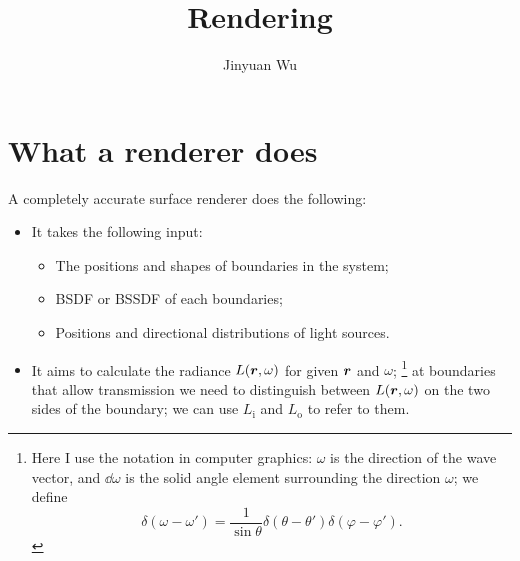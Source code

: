 \documentclass[hyperref, a4paper]{article}
\title{Rendering}
\author{Jinyuan Wu}
\begin{document}
\maketitle

\section{What a renderer does}

A completely accurate surface renderer does the following:
\begin{itemize}
    \item It takes the following input: 
        \begin{itemize}
            \item The positions and shapes of boundaries in the system;
            \item BSDF or BSSDF of each boundaries;
            \item Positions and directional distributions of light sources.
        \end{itemize}
    \item It aims to calculate the radiance $L(\vb*{r}, \omega)$
        for given $\vb*{r}$ and $\omega$;%
        \footnote{
            Here I use the notation in computer graphics: 
            $\omega$ is the direction of the wave vector, 
            and $\dd{\omega}$ is the solid angle element 
            surrounding the direction $\omega$;
            we define 
            \begin{equation}
                \delta(\omega - \omega') = \frac{1}{\sin \theta} \delta(\theta - \theta') \delta(\varphi - \varphi').
            \end{equation}
        }
        at boundaries that allow transmission 
        we need to distinguish between $L(\vb*{r}, \omega)$
        on the two sides of the boundary;
        we can use $L_{\text{i}}$ and $L_{\text{o}}$ 
        to refer to them.


\end{itemize}
\end{document}
